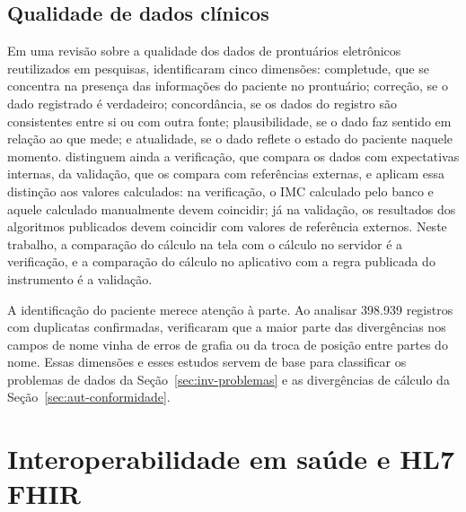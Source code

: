 \subsection{Qualidade de dados clínicos}
\label{sec:ref-qualidade}

Em uma revisão sobre a qualidade dos dados de prontuários eletrônicos reutilizados em pesquisas,
 identificaram cinco dimensões: completude, que se concentra na presença
das informações do paciente no prontuário; correção, se o dado registrado é verdadeiro; concordância, se os dados do
registro são consistentes entre si ou com outra fonte; plausibilidade, se o dado faz sentido em relação ao que mede;
e atualidade, se o dado reflete o estado do paciente naquele momento. 
distinguem ainda a verificação, que compara os dados com expectativas internas, da validação, que os compara com
referências externas, e aplicam essa distinção aos valores calculados: na verificação, o IMC calculado pelo banco e
aquele calculado manualmente devem coincidir; já na validação, os resultados dos algoritmos publicados devem
coincidir com valores de referência externos. Neste trabalho, a comparação do cálculo na tela com o cálculo no
servidor é a verificação, e a comparação do cálculo no aplicativo com a regra publicada do instrumento é a validação.

A identificação do paciente merece atenção à parte. Ao analisar 398.939 registros com duplicatas confirmadas,
 verificaram que a maior parte das divergências nos campos de nome vinha de erros
de grafia ou da troca de posição entre partes do nome. Essas dimensões e esses estudos servem de base para classificar
os problemas de dados da Seção~\ref{sec:inv-problemas} e as divergências de cálculo da
Seção~\ref{sec:aut-conformidade}.

\section{Interoperabilidade em saúde e HL7 FHIR}
\label{sec:ref-fhir}


